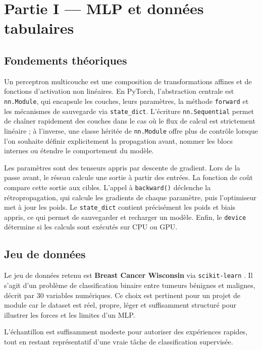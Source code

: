 \chapter{Partie I --- MLP et données tabulaires}

\section{Fondements théoriques}
Un perceptron multicouche est une composition de transformations affines et de fonctions d’activation non linéaires. En PyTorch, l’abstraction centrale est \texttt{nn.Module}, qui encapsule les couches, leurs paramètres, la méthode \texttt{forward} et les mécanismes de sauvegarde via \texttt{state\_dict}. L’écriture \texttt{nn.Sequential} permet de chaîner rapidement des couches dans le cas où le flux de calcul est strictement linéaire ; à l’inverse, une classe héritée de \texttt{nn.Module} offre plus de contrôle lorsque l’on souhaite définir explicitement la propagation avant, nommer les blocs internes ou étendre le comportement du modèle.

Les paramètres sont des tenseurs appris par descente de gradient. Lors de la passe avant, le réseau calcule une sortie à partir des entrées. La fonction de coût compare cette sortie aux cibles. L’appel à \texttt{backward()} déclenche la rétropropagation, qui calcule les gradients de chaque paramètre, puis l’optimiseur met à jour les poids. Le \texttt{state\_dict} contient précisément les poids et biais appris, ce qui permet de sauvegarder et recharger un modèle. Enfin, le \texttt{device} détermine si les calculs sont exécutés sur CPU ou GPU.

\section{Jeu de données}
Le jeu de données retenu est \textbf{Breast Cancer Wisconsin} via \texttt{scikit-learn} \citep{pedregosa2011scikit}. Il s’agit d’un problème de classification binaire entre tumeurs bénignes et malignes, décrit par 30 variables numériques. Ce choix est pertinent pour un projet de module car le dataset est réel, propre, léger et suffisamment structuré pour illustrer les forces et les limites d’un MLP.

\begin{table}[H]
    \centering
    \caption{Résumé du jeu de données tabulaire utilisé.}
\end{table}
L'échantillon est suffisamment modeste pour autoriser des expériences rapides, tout en restant représentatif d'une vraie tâche de classification supervisée.

